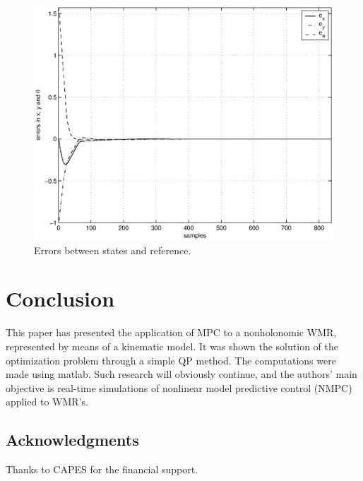 \documentclass[twocolumn]{IEEEtran} %
\begin{document}
\begin{figure}[H]\begin{center}
    \includegraphics[width=.95\linewidth]{Figures/errors.eps}
    \caption{Errors between states and reference.}
    \label{fig:errors}
\end{center}\end{figure}

\section{Conclusion}\label{sec:conclusions}
This paper has presented the application of MPC to a nonholonomic WMR, represented by means of a kinematic model. It was shown the solution of the optimization problem through a simple QP method. The computations were made using {\sc matlab}. Such research will obviously continue, and the authors' main objective is real-time simulations of nonlinear model predictive control (NMPC) applied to WMR's.

\subsection*{Acknowledgments}
Thanks to CAPES for the financial support.
\end{document}
